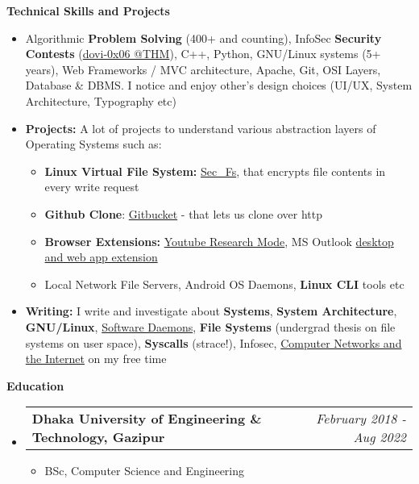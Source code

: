 \documentclass[legalpaper,10pt]{article}
\makeatletter
\newcommand{\resheading}[1]{{\large \colorbox{mygrey}{\begin{minipage}{\textwidth}{\textbf{#1 \vphantom{p\^{E}}}}\end{minipage}}}}
\newcommand{\ressubheading}[4]{
	\begin{tabular*}{7.1in}{l@{\extracolsep{\fill}}r}
		\textbf{#1} & \textit{#4} \\
	\end{tabular*}\vspace{-6pt}}
\makeatother
\begin{document}
	\vspace{0.15in}
	\resheading{Technical Skills and Projects}
	\begin{itemize}  
		\item Algorithmic \textbf{Problem Solving} (400+ and counting), InfoSec \textbf{Security Contests} (\href{https://tryhackme.com/p/dovi}{dovi-0x06 @THM}), C++, Python, GNU/Linux systems (5+ years), Web Frameworks / MVC architecture, Apache, Git, OSI Layers, Database \& DBMS. I notice and enjoy other's design choices (UI/UX, System Architecture, Typography etc)
    	 \item \textbf{Projects:} A lot of projects to understand various abstraction layers of Operating Systems such as:
    	    \begin{itemize}
    	        \item \textbf{Linux Virtual File System:}         \href{https://github.com/ovebepari/sec\_fs}{Sec\_Fs}, that encrypts file contents in every write request
    	        \item \textbf{Github Clone}: \href{https://github.com/ovebepari/Github_Clone}{Gitbucket} - that lets us clone over http
    	        \item \textbf{Browser Extensions:} \href{https://github.com/ovebepari/Youtube-Research-Mode}{Youtube Research Mode}, MS Outlook \href{https://github.com/ovebepari/PhishMe}{desktop and web app extension}
    	        \item Local Network File Servers, Android OS Daemons, \textbf{Linux CLI} tools etc
    	    \end{itemize}
		
    	\vspace{0.03in}

		\item \textbf{Writing:} I write and investigate about \textbf{Systems}, \textbf{System Architecture}, \textbf{GNU/Linux}, \href{https://ovebepari.github.io/linux\%7Csystems/docker-socket-tale/}{Software Daemons}, \textbf{File Systems} (undergrad thesis on file systems on user space), \textbf{Syscalls} (strace!), Infosec, \href{https://ovebepari.github.io/Computer-Networking-Series/}{Computer Networks and the Internet} on my free time
		
		\vspace{0.03in}
	\end{itemize}

    \vspace{0.15in}
    \resheading{Education}
	\begin{itemize}
	
		\item \ressubheading{Dhaka University of Engineering \& Technology, Gazipur}{}{}{February 2018 - Aug 2022}
		\begin{itemize}
			\item BSc, Computer Science and Engineering
		\end{itemize}

	\end{itemize}
\end{document}
